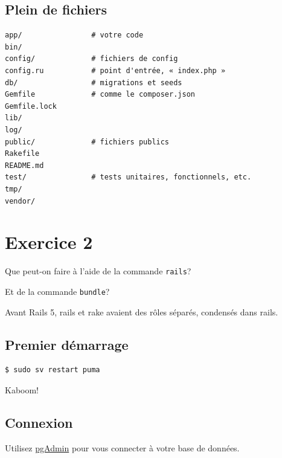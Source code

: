\hypertarget{plein-de-fichiers}{%
\subsection{Plein de fichiers}\label{plein-de-fichiers}}

\begin{english}

\begin{verbatim}
app/                # votre code
bin/
config/             # fichiers de config
config.ru           # point d'entrée, « index.php »
db/                 # migrations et seeds
Gemfile             # comme le composer.json
Gemfile.lock
lib/
log/
public/             # fichiers publics
Rakefile
README.md
test/               # tests unitaires, fonctionnels, etc.
tmp/
vendor/
\end{verbatim}

\end{english}

\hypertarget{exercice-2}{%
\section{Exercice 2}\label{exercice-2}}

Que peut-on faire à l'aide de la commande \textenglish{\texttt{rails}}?

Et de la commande \textenglish{\texttt{bundle}}?

Avant Rails 5, rails et rake avaient des rôles séparés, condensés dans
rails.

\hypertarget{premier-duxe9marrage}{%
\subsection{Premier démarrage}\label{premier-duxe9marrage}}

\begin{english}

\begin{verbatim}
$ sudo sv restart puma
\end{verbatim}

\end{english}

Kaboom!

\hypertarget{connexion-1}{%
\subsection{Connexion}\label{connexion-1}}

Utilisez \href{https://www.pgadmin.org/}{pgAdmin} pour vous connecter à
votre base de données.

